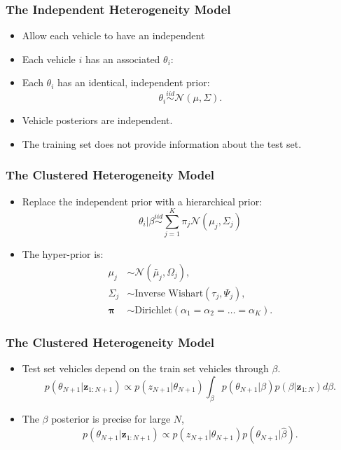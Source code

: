 \documentclass[11pt]{beamer}\usepackage[]{graphicx}\usepackage[]{color}
\begin{document}
\begin{frame}
\frametitle{The Independent Heterogeneity Model}
\begin{itemize}
\item Allow each vehicle to have an independent 
\item Each vehicle $i$ has an associated $\theta_i$:
\item Each $\theta_i$ has an identical, independent prior:
\begin{equation}
\theta_i \overset{iid}{\sim} \mathcal{N}\left(\mu, \Sigma \right). 
\end{equation}
\item Vehicle posteriors are independent.
\item The training set does not provide information about the test set.
\end{itemize}
\end{frame}

\begin{frame}
\frametitle{The Clustered Heterogeneity Model}
\begin{itemize}
\item Replace the independent prior with a hierarchical prior:
\begin{equation}
\theta_i | \beta  \overset{iid}{\sim} \sum_{j=1}^K \pi_j \mathcal{N}(\mu_j, \Sigma_j)
\end{equation}
\pause
\item The hyper-prior is:
\begin{align*}
\mu_j &\sim \mathcal{N}\left(\bar{\mu}_j, \Omega_j\right), \\
\Sigma_j &\sim \mbox{Inverse Wishart}\left(\tau_j, \Psi_j\right), \\
\boldsymbol{\pi} &\sim \mbox{Dirichlet}\left(\alpha_1 = \alpha_2 = \dots = \alpha_K\right).
\end{align*}
\end{itemize}
\end{frame}

\begin{frame}
\frametitle{The Clustered Heterogeneity Model}
\begin{itemize}
\item Test set vehicles depend on the train set vehicles through $\beta$.
\begin{equation}
\label{hierNewCar}
p(\theta_{N+1} | \textbf{z}_{1:N+1}) \propto p(z_{N+1} | \theta_{N+1}) \int_{\beta} p(\theta_{N+1} | \beta) p (\beta | \textbf{z}_{1:N}) d\beta.
\end{equation}
\pause
\item The $\beta$ posterior is precise for large $N$,
\begin{equation}
\label{hierNewCar2}
p(\theta_{N+1} | \textbf{z}_{1:N+1}) \propto p(z_{N+1} | \theta_{N+1}) p(\theta_{N+1} | \hat{\beta}).
\end{equation}
\end{itemize}
\end{frame}
\end{document}
